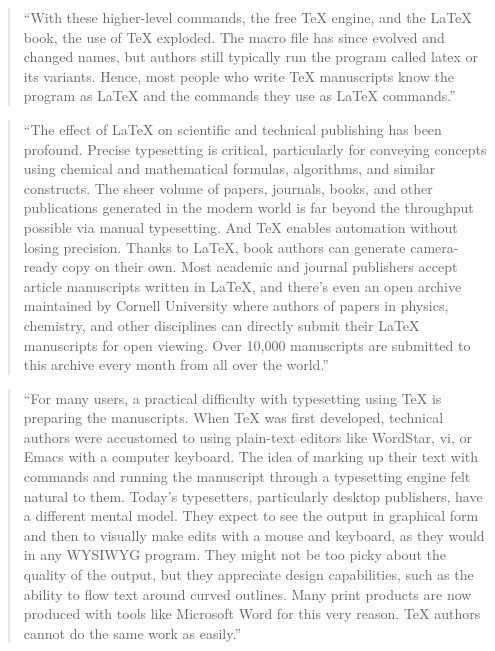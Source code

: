 \documentclass[]{tufte-book}
\begin{document}
\begin{quote}
``With these higher-level commands, the free TeX engine, and the LaTeX book,
the use of TeX exploded. The macro file has since evolved and changed names, but
authors still typically run the program called latex or its variants. Hence,
most people who write TeX manuscripts know the program as LaTeX and the commands
they use as LaTeX commands.'' \citep{apte2019lingua}
\end{quote}

\begin{quote}
``The effect of LaTeX on scientific and technical publishing has been profound.
Precise typesetting is critical, particularly for conveying concepts using
chemical and mathematical formulas, algorithms, and similar constructs. The
sheer volume of papers, journals, books, and other publications generated in the
modern world is far beyond the throughput possible via manual typesetting. And
TeX enables automation without losing precision. Thanks to LaTeX, book authors
can generate camera-ready copy on their own. Most academic and journal
publishers accept article manuscripts written in LaTeX, and there's even an open
archive maintained by Cornell University where authors of papers in physics,
chemistry, and other disciplines can directly submit their LaTeX manuscripts for
open viewing. Over 10,000 manuscripts are submitted to this archive every month
from all over the world.'' \citep{apte2019lingua}
\end{quote}

\begin{quote}
``For many users, a practical difficulty with typesetting using TeX is
preparing the manuscripts. When TeX was first developed, technical authors were
accustomed to using plain-text editors like WordStar, vi, or Emacs with a
computer keyboard. The idea of marking up their text with commands and running
the manuscript through a typesetting engine felt natural to them. Today's
typesetters, particularly desktop publishers, have a different mental model.
They expect to see the output in graphical form and then to visually make edits
with a mouse and keyboard, as they would in any WYSIWYG program. They might not
be too picky about the quality of the output, but they appreciate design
capabilities, such as the ability to flow text around curved outlines. Many
print products are now produced with tools like Microsoft Word for this very
reason. TeX authors cannot do the same work as easily.'' \citep{apte2019lingua}
\end{quote}
\end{document}
